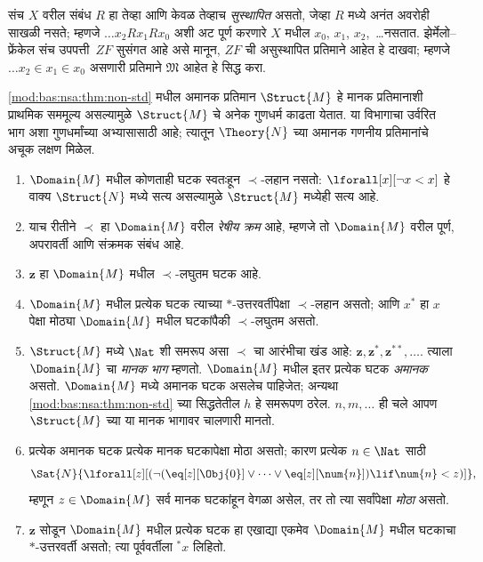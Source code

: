\begin{prob}
संच $X$ वरील संबंध $R$ हा तेव्हा आणि केवळ तेव्हाच
\emph{सुस्थापित} असतो, जेव्हा $R$ मध्ये अनंत अवरोही साखळी
नसते; म्हणजे $\dots x_2Rx_1Rx_0$ अशी अट पूर्ण करणारे
$X$ मधील $x_0$, $x_1$, $x_2$,~\dots नसतात.
झेर्मेलो--फ्रेंकेल संच उपपत्ती~$ZF$ सुसंगत आहे असे मानून,
$ZF$ ची असुस्थापित प्रतिमाने आहेत हे दाखवा; म्हणजे
$\dots x_2 \in x_1 \in x_0$ असणारी प्रतिमाने
$\mathfrak{M}$ आहेत हे सिद्ध करा.
\end{prob}

\ref{mod:bas:nsa:thm:non-std} मधील अमानक प्रतिमान
$\Struct{M}$ हे मानक प्रतिमानाशी प्राथमिक सममूल्य असल्यामुळे
$\Struct{M}$ चे अनेक गुणधर्म काढता येतात. या विभागाचा
उर्वरित भाग अशा गुणधर्मांच्या अभ्यासासाठी आहे; त्यातून
$\Theory{N}$ च्या अमानक गणनीय प्रतिमानांचे
अचूक लक्षण मिळेल.

\begin{enumerate}
\item $\Domain{M}$ मधील कोणताही घटक स्वतःहून $\prec$-लहान
  नसतो: $\lforall[x][\lnot x < x]$ हे वाक्य $\Struct{N}$
  मध्ये सत्य असल्यामुळे $\Struct{M}$ मध्येही सत्य आहे.
\item याच रीतीने $\prec$ हा $\Domain{M}$ वरील
  \emph{रेषीय क्रम} आहे, म्हणजे तो $\Domain{M}$ वरील
  पूर्ण, अपरावर्ती आणि संक्रमक संबंध आहे.
\item $\mathbf{z}$ हा $\Domain{M}$ मधील $\prec$-लघुतम घटक आहे.
\item $\Domain{M}$ मधील प्रत्येक घटक त्याच्या $*$-उत्तरवर्तीपेक्षा
  $\prec$-लहान असतो; आणि $x^*$ हा $x$ पेक्षा मोठ्या
  $\Domain{M}$ मधील घटकांपैकी $\prec$-लघुतम असतो.
\item $\Struct{M}$ मध्ये $\Nat$ शी समरूप असा $\prec$ चा
  आरंभीचा खंड आहे: $\mathbf{z}, \mathbf{z}^*,
  \mathbf{z}^{**}, \dots$. त्याला $\Domain{M}$ चा
  \emph{मानक भाग} म्हणतो. $\Domain{M}$ मधील इतर प्रत्येक
  घटक \emph{अमानक} असतो. $\Domain{M}$ मध्ये अमानक
  घटक असलेच पाहिजेत;
  अन्यथा \ref{mod:bas:nsa:thm:non-std} च्या सिद्धतेतील $h$ हे
  समरूपण ठरेल. $n, m, \dots$ ही चले आपण
  $\Struct{M}$ च्या या मानक भागावर चालणारी मानतो.
\item प्रत्येक अमानक घटक प्रत्येक मानक घटकापेक्षा मोठा
  असतो; कारण प्रत्येक $n \in \Nat$ साठी
  \[
  \Sat{N}{\lforall[z][(\lnot(\eq[z][\Obj{0}] \lor
  \dots \lor \eq[z][\num{n}]) \lif \num{n} < z)]},
  \]
  म्हणून $z \in \Domain{M}$ सर्व मानक घटकांहून
  वेगळा असेल, तर तो त्या सर्वांपेक्षा \emph{मोठा} असतो.
\item $\mathbf{z}$ सोडून $\Domain{M}$ मधील प्रत्येक
  घटक हा एखाद्या एकमेव $\Domain{M}$ मधील घटकाचा
  $*$-उत्तरवर्ती असतो; त्या पूर्ववर्तीला $^*x$ लिहितो.

\end{enumerate}
